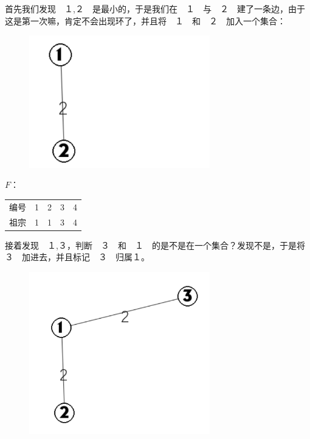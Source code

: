 首先我们发现　１,２　是最小的，于是我们在　１　与　２　建了一条边，由于这是第一次嘛，肯定不会出现环了，并且将　１　和　２　加入一个集合：

\begin{figure}[htbp]
\centering
\includegraphics[width=0.7\textwidth]{docs/graph/images/mst2.png} 

\end{figure}

$F$：

\begin{tabular}{rrrrr}
\hline
编号& 1& 2& 3& 4\\祖宗& 1& 1& 3& 4\\\hline
\end{tabular}

接着发现　１,３，判断　３　和　１　的是不是在一个集合？发现不是，于是将　３　加进去，并且标记　３　归属１。

\begin{figure}[htbp]
\centering
\includegraphics[width=0.7\textwidth]{docs/graph/images/mst3.png} 

\end{figure}

